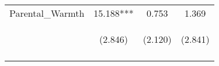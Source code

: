 \begin{tabular}{lccc}
\noalign{\smallskip}Parental_Warmth & 15.188*** & 0.753 & 1.369\\
 & \begin{footnotesize}(2.846)\end{footnotesize} & \begin{footnotesize}(2.120)\end{footnotesize} & \begin{footnotesize}(2.841)\end{footnotesize}\\
\noalign{\smallskip}\hline\end{tabular}\\
